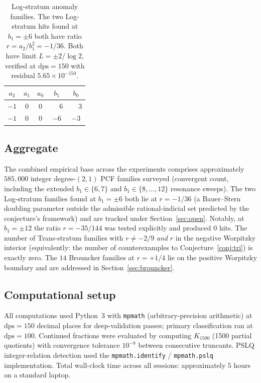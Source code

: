 \documentclass[11pt]{amsart}
\theoremstyle{definition}
\theoremstyle{remark}
\newcommand{\dps}{\mathrm{dps}}
\begin{document}
\begin{table}[t]
\centering
\caption{Log-stratum anomaly families.  The two Log-stratum hits
found at $b_1 = \pm 6$ both have ratio $r = a_2/b_1^2 = -1/36$.
Both have limit $L = \pm 2/\log 2$, verified at $\dps = 150$ with
residual $5.65 \times 10^{-150}$.}
\label{tab:log-anomaly}
\begin{tabular}{ccccc}
\toprule
$a_2$ & $a_1$ & $a_0$ & $b_1$ & $b_0$ \\
\midrule
$-1$ & $0$ & $0$ & $\phantom{-}6$ & $\phantom{-}3$ \\
$-1$ & $0$ & $0$ & $-6$ & $-3$ \\
\bottomrule
\end{tabular}
\end{table}

\subsection*{Aggregate}
The combined empirical base across the experiments comprises
approximately $585{,}000$ integer degree-$(2,1)$ PCF families
surveyed (convergent count, including the extended
$b_1 \in \{6,7\}$ and $b_1 \in \{8,\dots,12\}$ resonance sweeps).
The two Log-stratum families found at $b_1 = \pm 6$ both lie at
$r = -1/36$ (a Bauer--Stern doubling parameter outside the
admissible rational-indicial set predicted by the conjecture's
framework) and are tracked under Section~\ref{sec:open}.  Notably,
at $b_1 = \pm 12$ the ratio $r = -35/144$ was tested explicitly
and produced $0$ hits.  The number of Trans-stratum families with
$r \ne -2/9$ \emph{and} $r$ in the negative Worpitzky
interior
(equivalently: the number of counterexamples to
Conjecture~\ref{conj:tri}) is exactly zero.  The $14$ Brouncker
families at $r = +1/4$ lie on the positive Worpitzky boundary and
are addressed in Section~\ref{sec:brouncker}.

\subsection*{Computational setup}
All computations used Python~3 with \texttt{mpmath}
(arbitrary-precision arithmetic) at $\dps = 150$ decimal places
for deep-validation passes; primary classification ran at
$\dps = 100$.  Continued fractions were evaluated by computing
$K_{1500}$ (1500 partial quotients) with convergence tolerance
$10^{-8}$ between consecutive truncants.  PSLQ integer-relation
detection used the \texttt{mpmath.identify} / \texttt{mpmath.pslq}
implementation.  Total wall-clock time across all sessions:
approximately $5$ hours on a standard laptop.
\end{document}
